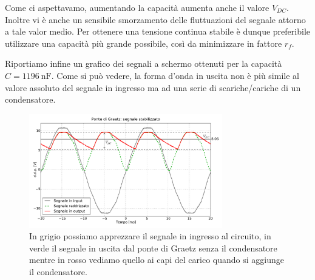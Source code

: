 Come ci aspettavamo, aumentando la capacità aumenta anche il valore $V_{DC}$. Inoltre vi è anche un sensibile smorzamento delle fluttuazioni del segnale attorno a tale valor medio. Per ottenere una tensione continua stabile è dunque preferibile utilizzare una capacità più grande possibile, così da minimizzare in fattore $r_f$.

Riportiamo infine un grafico dei segnali a schermo ottenuti per la capacità $C=\SI{1196}{\nano\farad}$. Come si può vedere, la forma d'onda in uscita non è più simile al valore assoluto del segnale in ingresso ma ad una serie di scariche/cariche di un condensatore.

\begin{figure}[h]
\center
	\includegraphics[width=0.75\textwidth]{ripple.pdf}
	\caption{In grigio possiamo apprezzare il segnale in ingresso al circuito, in verde il segnale in uscita dal ponte di Graetz senza il condensatore mentre in rosso vediamo quello ai capi del carico quando si aggiunge il condensatore.}
	\label{fig:ripple}
\end{figure}